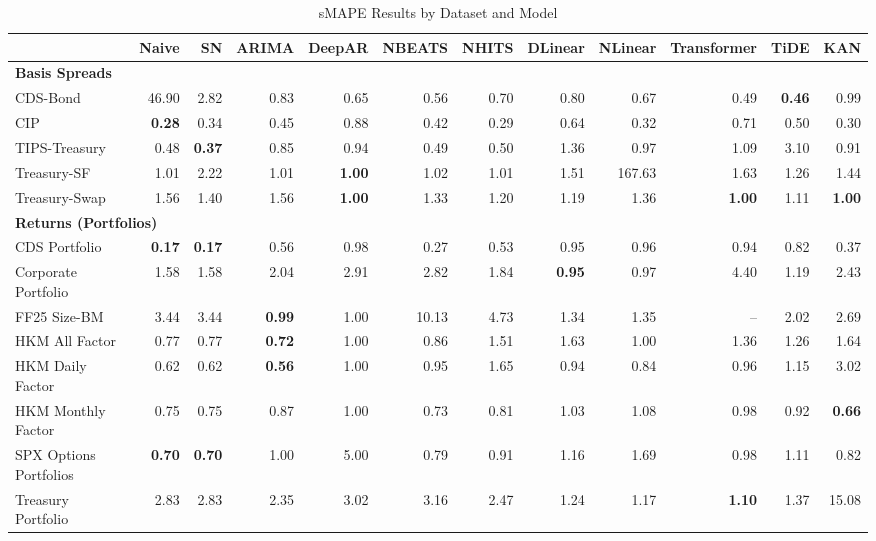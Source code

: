 
\begin{table}[htbp]
\centering
\caption{sMAPE Results by Dataset and Model}
\label{tab:smape_results}
\scriptsize
\setlength{\tabcolsep}{1.5pt}
\renewcommand{\arraystretch}{0.9}
\begin{tabular}{@{}lrrrrrrrrrrr@{}}
\toprule
 & Naive & SN & ARIMA & DeepAR & NBEATS & NHITS & DLinear & NLinear & Transformer & TiDE & KAN \\
\midrule
\multicolumn{12}{l}{\textbf{Basis Spreads}} \\
CDS-Bond & 46.90 & 2.82 & 0.83 & 0.65 & 0.56 & 0.70 & 0.80 & 0.67 & 0.49 & \textbf{0.46} & 0.99 \\
CIP & \textbf{0.28} & 0.34 & 0.45 & 0.88 & 0.42 & 0.29 & 0.64 & 0.32 & 0.71 & 0.50 & 0.30 \\
TIPS-Treasury & 0.48 & \textbf{0.37} & 0.85 & 0.94 & 0.49 & 0.50 & 1.36 & 0.97 & 1.09 & 3.10 & 0.91 \\
Treasury-SF & 1.01 & 2.22 & 1.01 & \textbf{1.00} & 1.02 & 1.01 & 1.51 & 167.63 & 1.63 & 1.26 & 1.44 \\
Treasury-Swap & 1.56 & 1.40 & 1.56 & \textbf{1.00} & 1.33 & 1.20 & 1.19 & 1.36 & \textbf{1.00} & 1.11 & \textbf{1.00} \\
\midrule
\multicolumn{12}{l}{\textbf{Returns (Portfolios)}} \\
CDS Portfolio & \textbf{0.17} & \textbf{0.17} & 0.56 & 0.98 & 0.27 & 0.53 & 0.95 & 0.96 & 0.94 & 0.82 & 0.37 \\
Corporate Portfolio & 1.58 & 1.58 & 2.04 & 2.91 & 2.82 & 1.84 & \textbf{0.95} & 0.97 & 4.40 & 1.19 & 2.43 \\
FF25 Size-BM & 3.44 & 3.44 & \textbf{0.99} & 1.00 & 10.13 & 4.73 & 1.34 & 1.35 & -- & 2.02 & 2.69 \\
HKM All Factor & 0.77 & 0.77 & \textbf{0.72} & 1.00 & 0.86 & 1.51 & 1.63 & 1.00 & 1.36 & 1.26 & 1.64 \\
HKM Daily Factor & 0.62 & 0.62 & \textbf{0.56} & 1.00 & 0.95 & 1.65 & 0.94 & 0.84 & 0.96 & 1.15 & 3.02 \\
HKM Monthly Factor & 0.75 & 0.75 & 0.87 & 1.00 & 0.73 & 0.81 & 1.03 & 1.08 & 0.98 & 0.92 & \textbf{0.66} \\
SPX Options Portfolios & \textbf{0.70} & \textbf{0.70} & 1.00 & 5.00 & 0.79 & 0.91 & 1.16 & 1.69 & 0.98 & 1.11 & 0.82 \\
Treasury Portfolio & 2.83 & 2.83 & 2.35 & 3.02 & 3.16 & 2.47 & 1.24 & 1.17 & \textbf{1.10} & 1.37 & 15.08 \\

\end{tabular}
\end{table}
